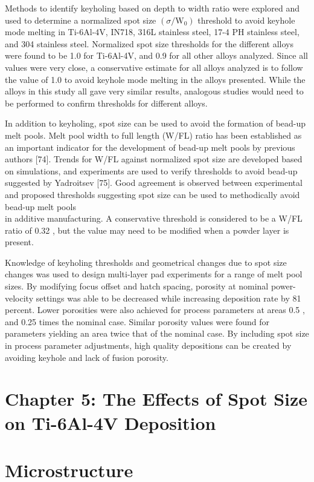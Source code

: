 \documentclass[10pt]{article}
\begin{document}
Methods to identify keyholing based on depth to width ratio were explored and used to determine a normalized spot size $\left(\sigma / \mathrm{W}_{0}\right)$ threshold to avoid keyhole mode melting in Ti-6Al-4V, IN718, 316L stainless steel, 17-4 PH stainless steel, and 304 stainless steel. Normalized spot size thresholds for the different alloys were found to be 1.0 for Ti-6Al-4V, and 0.9 for all other alloys analyzed. Since all values were very close, a conservative estimate for all alloys analyzed is to follow the value of 1.0 to avoid keyhole mode melting in the alloys presented. While the alloys in this study all gave very similar results, analogous studies would need to be performed to confirm thresholds for different alloys.

In addition to keyholing, spot size can be used to avoid the formation of bead-up melt pools. Melt pool width to full length (W/FL) ratio has been established as an important indicator for the development of bead-up melt pools by previous authors [74]. Trends for W/FL against normalized spot size are developed based on simulations, and experiments are used to verify thresholds to avoid bead-up suggested by Yadroitsev [75]. Good agreement is observed between experimental and proposed thresholds suggesting spot size can be used to methodically avoid bead-up melt pools\\
in additive manufacturing. A conservative threshold is considered to be a W/FL ratio of 0.32 , but the value may need to be modified when a powder layer is present.

Knowledge of keyholing thresholds and geometrical changes due to spot size changes was used to design multi-layer pad experiments for a range of melt pool sizes. By modifying focus offset and hatch spacing, porosity at nominal power-velocity settings was able to be decreased while increasing deposition rate by 81 percent. Lower porosities were also achieved for process parameters at areas 0.5 , and 0.25 times the nominal case. Similar porosity values were found for parameters yielding an area twice that of the nominal case. By including spot size in process parameter adjustments, high quality depositions can be created by avoiding keyhole and lack of fusion porosity.

\section*{Chapter 5: The Effects of Spot Size on Ti-6Al-4V Deposition}
\section*{Microstructure}
\end{document}
